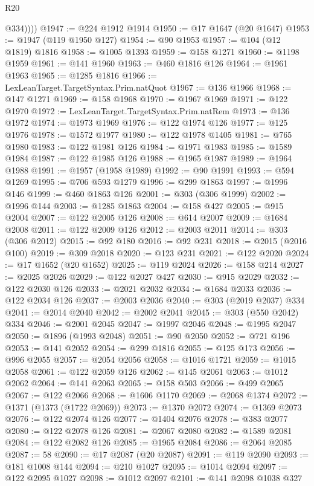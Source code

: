 \begin{lexlean}{R20}
\begin{coremodule}
            @334))))
@1947 := @224 @1912 @1914
@1950 := @17 @1647 (@20 @1647)
@1953 := @1947 (@119 @1950 @127)
@1954 := @90 @1953
@1957 := @104 (@12 @1819) @1816
@1958 := @1005 @1393
@1959 := @158 @1271
@1960 := @1198 @1959
@1961 := @141 @1960
@1963 := @460 @1816 @126
@1964 := @1961 @1963
@1965 := @1285 @1816
@1966 := LexLeanTarget.TargetSyntax.Prim.natQuot
@1967 := @136 @1966
@1968 := @147 @1271
@1969 := @158 @1968
@1970 := @1967 @1969
@1971 := @122 @1970
@1972 := LexLeanTarget.TargetSyntax.Prim.natRem
@1973 := @136 @1972
@1974 := @1973 @1969
@1976 := @122 @1974 @126
@1977 := @125 @1976
@1978 := @1572 @1977
@1980 := @122 @1978 @1405
@1981 := @765 @1980
@1983 := @122 @1981 @126
@1984 := @1971 @1983
@1985 := @1589 @1984
@1987 := @122 @1985 @126
@1988 := @1965 @1987
@1989 := @1964 @1988
@1991 := @1957 (@1958 @1989)
@1992 := @90 @1991
@1993 := @594 @1269
@1995 := @706 @593 @1279
@1996 := @299 @1863
@1997 := @1996 @146
@1999 := @460 @1863 @126
@2001 := @303 (@306 @1999)
@2002 := @1996 @144
@2003 := @1285 @1863
@2004 := @158 @427
@2005 := @915 @2004
@2007 := @122 @2005 @126
@2008 := @614 @2007
@2009 := @1684 @2008
@2011 := @122 @2009 @126
@2012 := @2003 @2011
@2014 := @303 (@306 @2012)
@2015 := @92 @180
@2016 := @92 @231
@2018 := @2015 (@2016 @100)
@2019 := @309 @2018
@2020 := @123 @231
@2021 := @122 @2020
@2024 := @17 @1652 (@20 @1652)
@2025 := @119 @2024
@2026 := @158 @214
@2027 := @2025 @2026
@2029 := @122 @2027 @427
@2030 := @915 @2029
@2032 := @122 @2030 @126
@2033 := @2021 @2032
@2034 := @1684 @2033
@2036 := @122 @2034 @126
@2037 := @2003 @2036
@2040 := @303 (@2019 @2037) @334
@2041 := @2014 @2040
@2042 := @2002 @2041
@2045 := @303 (@550 @2042) @334
@2046 := @2001 @2045
@2047 := @1997 @2046
@2048 := @1995 @2047
@2050 := @1896 (@1993 @2048)
@2051 := @90 @2050
@2052 := @721 @196
@2053 := @141 @2052
@2054 := @299 @1816
@2055 := @125 @173
@2056 := @996 @2055
@2057 := @2054 @2056
@2058 := @1016 @1721
@2059 := @1015 @2058
@2061 := @122 @2059 @126
@2062 := @145 @2061
@2063 := @1012 @2062
@2064 := @141 @2063
@2065 := @158 @503
@2066 := @499 @2065
@2067 := @122 @2066
@2068 := @1606 @1170
@2069 := @2068 @1374
@2072 := @1371 (@1373 (@1722 @2069))
@2073 := @1370 @2072
@2074 := @1369 @2073
@2076 := @122 @2074 @126
@2077 := @1404 @2076
@2078 := @383 @2077
@2080 := @122 @2078 @126
@2081 := @2067 @2080
@2082 := @1589 @2081
@2084 := @122 @2082 @126
@2085 := @1965 @2084
@2086 := @2064 @2085
@2087 := 58
@2090 := @17 @2087 (@20 @2087)
@2091 := @119 @2090
@2093 := @181 @1008 @144
@2094 := @210 @1027
@2095 := @1014 @2094
@2097 := @122 @2095 @1027
@2098 := @1012 @2097
@2101 := @141 @2098 @1038 @327

\end{coremodule}
\end{lexlean}
